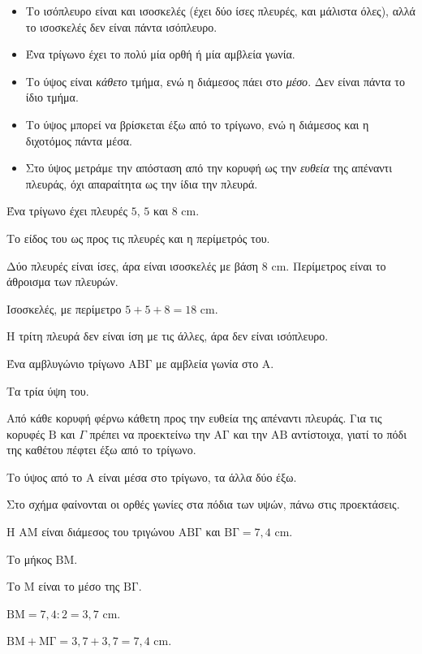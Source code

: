 \begin{prosoxi}
\begin{itemize}[leftmargin=1.2em,itemsep=0.3ex,topsep=2pt]
\item Το ισόπλευρο είναι και ισοσκελές (έχει δύο ίσες πλευρές, και μάλιστα όλες), αλλά το ισοσκελές δεν είναι πάντα ισόπλευρο.
\item Ένα τρίγωνο έχει το πολύ μία ορθή ή μία αμβλεία γωνία.
\item Το ύψος είναι \emph{κάθετο} τμήμα, ενώ η διάμεσος πάει στο \emph{μέσο}. Δεν είναι πάντα το ίδιο τμήμα.
\item Το ύψος μπορεί να βρίσκεται έξω από το τρίγωνο, ενώ η διάμεσος και η διχοτόμος πάντα μέσα.
\item Στο ύψος μετράμε την απόσταση από την κορυφή ως την \emph{ευθεία} της απέναντι πλευράς, όχι απαραίτητα ως την ίδια την πλευρά.
\end{itemize}
\end{prosoxi}


\tixero Ένα τρίγωνο έχει πλευρές $5$, $5$ και $8$ cm.\par
\tithelo Το είδος του ως προς τις πλευρές και η περίμετρός του.\par
\possindeo Δύο πλευρές είναι ίσες, άρα είναι ισοσκελές με βάση $8$ cm. Περίμετρος είναι το άθροισμα των πλευρών.\par
\apantisi Ισοσκελές, με περίμετρο $5+5+8=18$ cm.\par
\elegxos Η τρίτη πλευρά δεν είναι ίση με τις άλλες, άρα δεν είναι ισόπλευρο.

\tixero Ένα αμβλυγώνιο τρίγωνο $\mathrm{ΑΒΓ}$ με αμβλεία γωνία στο $\mathrm{Α}$.\par
\tithelo Τα τρία ύψη του.\par
\possindeo Από κάθε κορυφή φέρνω κάθετη προς την ευθεία της απέναντι πλευράς. Για τις κορυφές $\mathrm{Β}$ και $\Gamma$ πρέπει να προεκτείνω την $\mathrm{ΑΓ}$ και την $\mathrm{ΑΒ}$ αντίστοιχα, γιατί το πόδι της καθέτου πέφτει έξω από το τρίγωνο.\par
\apantisi Το ύψος από το $\mathrm{Α}$ είναι μέσα στο τρίγωνο, τα άλλα δύο έξω.\par
\elegxos Στο σχήμα φαίνονται οι ορθές γωνίες στα πόδια των υψών, πάνω στις προεκτάσεις.

\tixero Η $\mathrm{ΑΜ}$ είναι διάμεσος του τριγώνου $\mathrm{ΑΒΓ}$ και $\mathrm{ΒΓ}=7{,}4$ cm.\par
\tithelo Το μήκος $\mathrm{ΒΜ}$.\par
\possindeo Το $\mathrm{Μ}$ είναι το μέσο της $\mathrm{ΒΓ}$.\par
\apantisi $\mathrm{ΒΜ}=7{,}4:2=3{,}7$ cm.\par
\elegxos $\mathrm{ΒΜ}+\mathrm{ΜΓ}=3{,}7+3{,}7=7{,}4$ cm.

